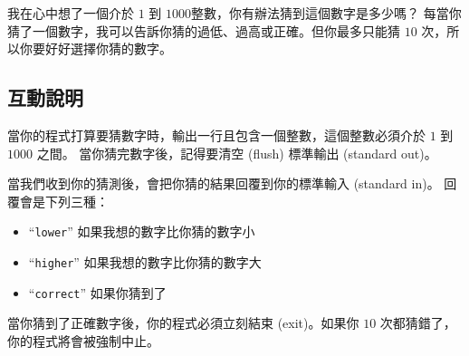 
我在心中想了一個介於 $1$ 到 $1000$整數，你有辦法猜到這個數字是多少嗎？
每當你猜了一個數字，我可以告訴你猜的過低、過高或正確。但你最多只能猜 $10$ 次，所以你要好好選擇你猜的數字。

\subsection*{互動說明}

當你的程式打算要猜數字時，輸出一行且包含一個整數，這個整數必須介於 $1$ 到 $1000$ 之間。
當你猜完數字後，記得要清空 (flush) 標準輸出 (standard out)。

當我們收到你的猜測後，會把你猜的結果回覆到你的標準輸入 (standard in)。
回覆會是下列三種：
\begin{itemize}
\item ``\texttt{lower}'' 如果我想的數字比你猜的數字小
\item ``\texttt{higher}'' 如果我想的數字比你猜的數字大
\item ``\texttt{correct}'' 如果你猜到了
\end{itemize}

當你猜到了正確數字後，你的程式必須立刻結束 (exit)。如果你 $10$ 次都猜錯了，你的程式將會被強制中止。
